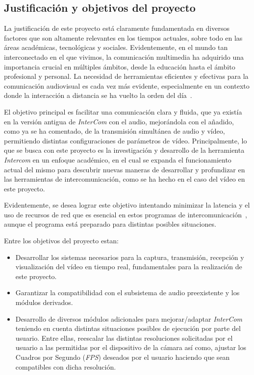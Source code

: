 \subsection{Justificación y objetivos del proyecto}
La justificación de este proyecto está claramente fundamentada en diversos factores que son altamente relevantes en los tiempos actuales, sobre todo en las áreas académicas, tecnológicas y sociales. Evidentemente, en el mundo tan interconectado en el que vivimos, la comunicación multimedia ha adquirido una importancia crucial en múltiples ámbitos, desde la educación hasta el ámbito profesional y personal. La necesidad de herramientas eficientes y efectivas para la comunicación audiovisual es cada vez más evidente, especialmente en un contexto donde la interacción a distancia se ha vuelto la orden del día~\cite{GSMA}.
\vspace{\baselineskip}

El objetivo principal es facilitar una comunicación clara y fluida, que ya existía en la versión antigua de \textit{InterCom} con el audio, mejorándola con el añadido, como ya se ha comentado, de la transmisión simultánea de audio y vídeo, permitiendo distintas configuraciones de parámetros de vídeo. Principalmente, lo que se busca con este proyecto es la investigación y desarrollo de la herramienta \textit{Intercom} en un enfoque académico, en el cual se expanda el funcionamiento actual del mismo para descubrir nuevas maneras de desarrollar y profundizar en las herramientas de intercomunicación, como se ha hecho en el caso del vídeo en este proyecto.

\vspace{\baselineskip}
Evidentemente, se desea lograr este objetivo intentando minimizar la latencia y el uso de recursos de red que es esencial en estos programas de intercomunicación~\cite{cisco}, aunque el programa está preparado para distintas posibles situaciones.

\vspace{\baselineskip}

Entre los objetivos del proyecto estan:

\begin{itemize}
	\item Desarrollar los sistemas necesarios para la captura, transmisión, recepción y visualización del vídeo en tiempo real, fundamentales para la realización de este proyecto.
	\item Garantizar la compatibilidad con el subsistema de audio preexistente y los módulos derivados.
	\item Desarrollo de diversos módulos adicionales para mejorar/adaptar \textit{InterCom} teniendo en cuenta distintas situaciones posibles de ejecución por parte del usuario. Entre ellas, reescalar las distintas resoluciones solicitadas por el usuario a las permitidas por el dispositivo de la cámara así como, ajustar los Cuadros por Segundo (\textit{FPS}) deseados por el usuario haciendo que sean compatibles con dicha resolución.
\end{itemize}
\vspace{\baselineskip}


